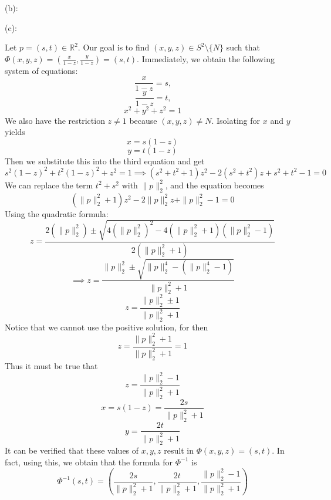 \documentclass{article}
\theoremstyle{plain} %
\numberwithin{thm}{section} %
\theoremstyle{definition}
\begin{document}
\begin{question}{23}
        (b):

        (c):

        Let \(p = (s,t) \in \mathbb{R}^2\). Our goal is to find \((x,y,z) \in S^2 \setminus \{N\}\) such that \(\Phi (x,y,z) = \left( \frac{x}{1-z}, \frac{y}{1-z} \right) = (s,t)\). Immediately, we obtain the following system of equations:
        \[
            \frac{x}{1-z} = s \text{,} 
        \]
        \[
            \frac{y}{1-z} = t \text{,} 
        \]
        \[
            x^2 + y^2 + z^2 = 1
        \]
        We also have the restriction \(z\neq 1\) because \((x,y,z) \neq N\). Isolating for \(x\) and \(y\) yields
        \[
            x=s(1-z)
        \]
        \[
            y=t(1-z)
        \]
        Then we substitute this into the third equation and get
        \[
            s^2(1-z)^2 + t^2(1-z)^2 + z^2 = 1 \implies (s^2 + t^2 + 1)z^2 - 2(s^2 + t^2)z + s^2 + t^2 - 1 = 0
        \]
        We can replace the term \(t^2 + s^2\) with \(\|p\| _2 ^2\), and the equation becomes
        \[
            (\|p\| _2 ^2 + 1)z^2 - 2\|p\| _2 ^2 z + \|p\| _2 ^2 - 1 = 0
        \]
        Using the quadratic formula:
        \[
            z = \frac{2(\|p\| _2 ^2) \pm \sqrt{4(\|p\| _2 ^2)^2 - 4(\|p\| _2 ^2 +1)(\|p\| _2 ^2 - 1)}}{2(\|p\| _2 ^2 + 1)}
        \]
        \[
            \implies z = \frac{\|p\| _2 ^2 \pm \sqrt{\|p\| _2 ^4 - (\|p\| _2 ^4 - 1)}}{\|p\| _2 ^2 + 1}
        \]
        \[
            z = \frac{\|p\| _2 ^2 \pm 1}{\|p\| _2 ^2 + 1}
        \]
        Notice that we cannot use the positive solution, for then
        \[
            z = \frac{\|p\| _2 ^2 + 1}{\|p\| _2 ^2 + 1} = 1
        \]
        Thus it must be true that
        \[
            z = \frac{\|p\| _2 ^2 - 1}{\|p\| _2 ^2 + 1}
        \]
        \[
            x = s(1-z) = \frac{2s}{\|p\| _2 ^2 + 1}
        \]
        \[
            y = \frac{2t}{\|p\| _2 ^2 + 1}
        \]
        It can be verified that these values of \(x,y,z\) result in \(\Phi (x,y,z) = (s,t)\). In fact, using this, we obtain that the formula for \(\Phi ^{-1}\) is
        \[
            \Phi ^{-1} (s,t) = \left(\frac{2s}{\|p\| _2 ^2 + 1}, \frac{2t}{\|p\| _2 ^2 + 1}, \frac{\|p\| _2 ^2 - 1}{\|p\| _2 ^2 + 1}\right)
        \]
    \end{question}
    \pagebreak
\end{document}
